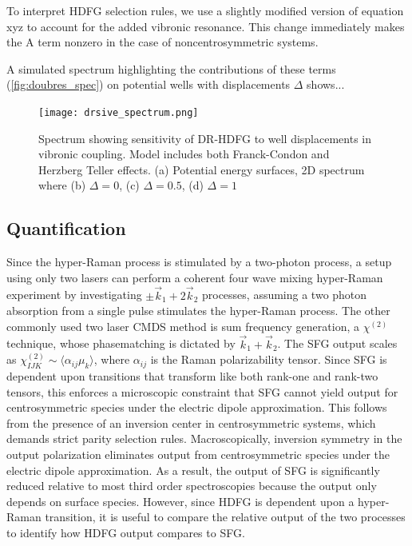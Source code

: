 \documentclass[aip, jcp, reprint, onecolumn]{revtex4-2}
\begin{document}
To interpret HDFG selection rules, we use a slightly modified version of equation xyz to account for the added vibronic resonance. 
This change immediately makes the A term nonzero in the case of noncentrosymmetric systems.

A simulated spectrum highlighting the contributions of these terms (\autoref{fig:doubres_spec}) on potential wells with displacements $\Delta$ shows... 
\begin{figure}[!htbp]
	\centering
	\texttt{[image: drsive\_spectrum.png]}
	\caption{Spectrum showing sensitivity of DR-HDFG to well displacements in vibronic coupling.
		Model includes both Franck-Condon and Herzberg Teller effects.
		(a) Potential energy surfaces, 2D spectrum where (b) $\Delta = 0$, (c) $\Delta = 0.5$, (d) $\Delta = 1$}
	\label{fig:doubres_spec}
\end{figure}





\subsection{Quantification}
Since the hyper-Raman process is stimulated by a two-photon process, a setup using only two lasers can perform a coherent four wave mixing hyper-Raman experiment by investigating $\pm \vec{k}_1 + 2\vec{k}_2$ processes, assuming a two photon absorption from a single pulse stimulates the hyper-Raman process.
The other commonly used two laser CMDS method is sum frequency generation, a $\chi^{(2)}$ technique, whose phasematching is dictated by $\vec{k}_1 + \vec{k}_2$.
The SFG output scales as $\chi^{(2)}_{IJK} \sim \langle \alpha_{ij} \mu_k \rangle$, where $\alpha_{ij}$ is the Raman polarizability tensor.
Since SFG is dependent upon transitions that transform like both rank-one and rank-two tensors, this enforces a microscopic constraint that SFG cannot yield output for centrosymmetric species under the electric dipole approximation.
This follows from the presence of an inversion center in centrosymmetric systems, which demands strict parity selection rules. \cite{RN230}
Macroscopically, inversion symmetry in the output polarization eliminates output from centrosymmetric species under the electric dipole approximation.\cite{RN227, RN132}
As a result, the output of SFG is significantly reduced relative to most third order spectroscopies because the output only depends on surface species.
However, since HDFG is dependent upon a hyper-Raman transition, it is useful to compare the relative output of the two processes to identify how HDFG output compares to SFG.
\end{document}
